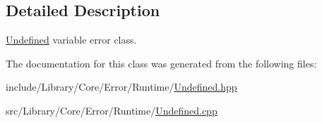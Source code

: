 \subsection{Detailed Description}
\hyperlink{classlibrary_1_1core_1_1error_1_1runtime_1_1_undefined}{Undefined} variable error class. 

The documentation for this class was generated from the following files\+:\begin{DoxyCompactItemize}
\item 
include/\+Library/\+Core/\+Error/\+Runtime/\hyperlink{_undefined_8hpp}{Undefined.\+hpp}\item 
src/\+Library/\+Core/\+Error/\+Runtime/\hyperlink{_undefined_8cpp}{Undefined.\+cpp}\end{DoxyCompactItemize}
